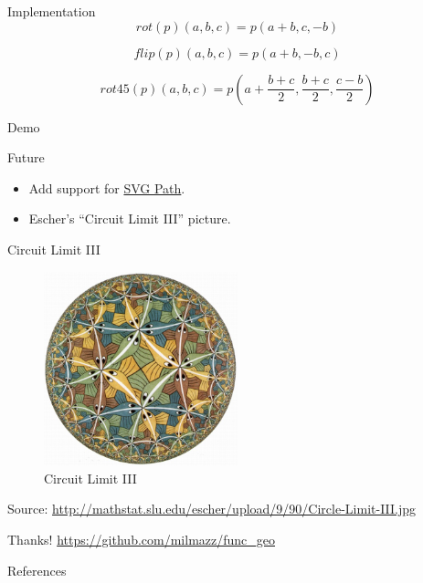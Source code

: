 \documentclass{beamer}
\begin{document}
    \begin{frame}{Implementation}
        \begin{equation*}
        rot(p)(a, b, c) = p(a + b, c, -b)
        \end{equation*}

        \begin{equation*}
        flip(p)(a, b, c) = p(a + b, -b, c)
        \end{equation*}

        \begin{equation*}
        rot45(p)(a, b, c) = p(a + \frac{b + c}{2}, \frac{b + c}{2}, \frac{c - b}{2})
        \end{equation*}
    \end{frame}

    \begin{frame}[standout]
        Demo
    \end{frame}

    \begin{frame}{Future}
        \begin{itemize}
            \item Add support for \href{https://developer.mozilla.org/en/docs/Web/SVG/Tutorial/Paths}{SVG Path}.
            \item Escher's ``Circuit Limit III'' picture.
        \end{itemize}

    \end{frame}

    \begin{frame}{Circuit Limit III}
        \begin{figure}
            \centering
            \includegraphics[width=0.5\textwidth]{./figs/Circle-Limit-III}
            \caption{Circuit Limit III}
            \label{fig:circuit_limit_iii}
        \end{figure}
        {\tiny Source: \url{http://mathstat.slu.edu/escher/upload/9/90/Circle-Limit-III.jpg}}
    \end{frame}

    \begin{frame}[standout]
        Thanks!
        \url{https://github.com/milmazz/func\_geo}
    \end{frame}

    \begin{frame}[allowframebreaks]{References}
        
        
    \end{frame}
\end{document}
